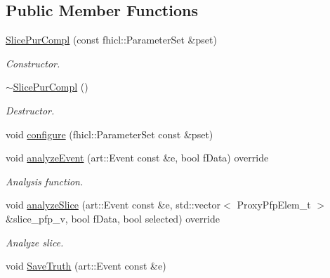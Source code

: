 \subsection*{Public Member Functions}
\begin{DoxyCompactItemize}
\item 
\hyperlink{classanalysis_1_1SlicePurCompl_a8d0b7176feea1c0cda563f1a528a4643}{Slice\-Pur\-Compl} (const fhicl\-::\-Parameter\-Set \&pset)
\begin{DoxyCompactList}\small\item\em Constructor. \end{DoxyCompactList}\item 
\hypertarget{classanalysis_1_1SlicePurCompl_aba1c519efb59ad152d186ab4a1a2c6ca}{\hyperlink{classanalysis_1_1SlicePurCompl_aba1c519efb59ad152d186ab4a1a2c6ca}{$\sim$\-Slice\-Pur\-Compl} ()}\label{classanalysis_1_1SlicePurCompl_aba1c519efb59ad152d186ab4a1a2c6ca}

\begin{DoxyCompactList}\small\item\em Destructor. \end{DoxyCompactList}\item 
void \hyperlink{classanalysis_1_1SlicePurCompl_a902e57f96d7a335793856af6c7f7580f}{configure} (fhicl\-::\-Parameter\-Set const \&pset)
\item 
void \hyperlink{classanalysis_1_1SlicePurCompl_af71528c37c501d30f5bbc1e75b50b3f6}{analyze\-Event} (art\-::\-Event const \&e, bool f\-Data) override
\begin{DoxyCompactList}\small\item\em Analysis function. \end{DoxyCompactList}\item 
\hypertarget{classanalysis_1_1SlicePurCompl_ab13316464f9ed61e81b18d59ca38d9a1}{void \hyperlink{classanalysis_1_1SlicePurCompl_ab13316464f9ed61e81b18d59ca38d9a1}{analyze\-Slice} (art\-::\-Event const \&e, std\-::vector$<$ Proxy\-Pfp\-Elem\-\_\-t $>$ \&slice\-\_\-pfp\-\_\-v, bool f\-Data, bool selected) override}\label{classanalysis_1_1SlicePurCompl_ab13316464f9ed61e81b18d59ca38d9a1}

\begin{DoxyCompactList}\small\item\em Analyze slice. \end{DoxyCompactList}\item 
\hypertarget{classanalysis_1_1SlicePurCompl_a39079f2f29d253440c7ebd2deeaccfef}{void \hyperlink{classanalysis_1_1SlicePurCompl_a39079f2f29d253440c7ebd2deeaccfef}{Save\-Truth} (art\-::\-Event const \&e)}\label{classanalysis_1_1SlicePurCompl_a39079f2f29d253440c7ebd2deeaccfef}


\end{DoxyCompactItemize}
